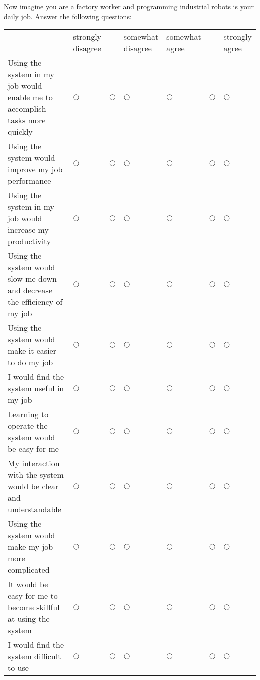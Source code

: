 \begin{question}{21}{Now imagine you are a factory worker and programming industrial robots is your daily job. Answer the following questions:}
	\noindent
	\begin{tabularx}{\textwidth}{p{5cm} *6{>{\Centering}X}}
		\hiderowcolors
		&\tiny \specialcell{strongly\\disagree} & \tiny \specialcell{disagree} &\tiny \specialcell{somewhat\\disagree} &\tiny \specialcell{somewhat\\agree} &\tiny \specialcell{agree} &\tiny \specialcell{strongly\\agree} \\
		\showrowcolors 
		Using the system in my job would enable me to accomplish tasks more quickly & $\bigcirc$ & $\bigcirc$ & $\bigcirc$ & $\bigcirc$ & $\bigcirc$ & $\bigcirc$\\
		Using the system would improve my job performance & $\bigcirc$ & $\bigcirc$ & $\bigcirc$ & $\bigcirc$ & $\bigcirc$ & $\bigcirc$\\
		Using the system in my job would increase my productivity & $\bigcirc$ & $\bigcirc$ & $\bigcirc$ & $\bigcirc$ & $\bigcirc$ & $\bigcirc$\\
		Using the system would slow me down and decrease the efficiency of my job & $\bigcirc$ & $\bigcirc$ & $\bigcirc$ & $\bigcirc$ & $\bigcirc$ & $\bigcirc$\\
		Using the system would make it easier to do my job & $\bigcirc$ & $\bigcirc$ & $\bigcirc$ & $\bigcirc$ & $\bigcirc$ & $\bigcirc$\\
		I would find the system useful in my job & $\bigcirc$ & $\bigcirc$ & $\bigcirc$ & $\bigcirc$ & $\bigcirc$ & $\bigcirc$\\
		Learning to operate the system would be easy for me & $\bigcirc$ & $\bigcirc$ & $\bigcirc$ & $\bigcirc$ & $\bigcirc$ & $\bigcirc$\\
		My interaction with the system would be clear and understandable & $\bigcirc$ & $\bigcirc$ & $\bigcirc$ & $\bigcirc$ & $\bigcirc$ & $\bigcirc$\\
		Using the system would make my job more complicated & $\bigcirc$ & $\bigcirc$ & $\bigcirc$ & $\bigcirc$ & $\bigcirc$ & $\bigcirc$\\
		It would be easy for me to become skillful at using the system & $\bigcirc$ & $\bigcirc$ & $\bigcirc$ & $\bigcirc$ & $\bigcirc$ & $\bigcirc$\\
		I would find the system difficult to use & $\bigcirc$ & $\bigcirc$ & $\bigcirc$ & $\bigcirc$ & $\bigcirc$ & $\bigcirc$\\
	\end{tabularx}
\end{question}



